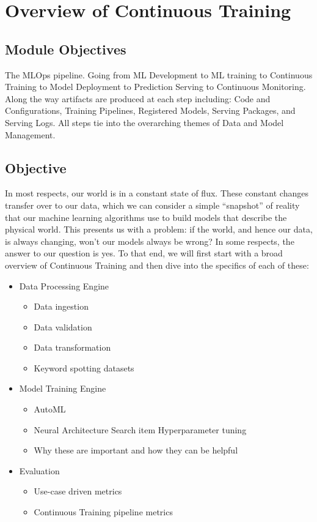 {{{{    
  
\section{Overview of Continuous Training}
\subsection{Module Objectives}

  
  The MLOps pipeline. Going from ML Development to ML training to Continuous Training to Model Deployment to Prediction Serving to Continuous Monitoring. Along the way artifacts are produced at each step including: Code and Configurations, Training Pipelines, Registered Models, Serving Packages, and Serving Logs. All steps tie into the overarching themes of Data and Model Management.
  
\subsection{Objective}

  In most respects, our world is in a constant state of flux. These constant changes transfer over to our data, which we can consider a simple “snapshot” of reality that our machine learning algorithms use to build models that describe the physical world. This presents us with a problem: if the world, and hence our data, is always changing, won’t our models always be wrong? In some respects, the answer to our question is yes. To that end, we will first start with a broad overview of Continuous Training and then dive into the specifics of each of these:
  
  \begin{itemize}
    \item  Data Processing Engine
      \begin{itemize}
        \item Data ingestion
        \item Data validation
        \item Data transformation
        \item Keyword spotting datasets
      \end{itemize}
  \item   Model Training Engine
    \begin{itemize}
      \item AutoML
      \item Neural Architecture Search
      item Hyperparameter tuning
      \item Why these are important and how they can be helpful
    \end{itemize}
  \item Evaluation
    \begin{itemize}
      \item Use-case driven metrics
      \item Continuous Training pipeline metrics
    \end{itemize}
  \end{itemize}
  
}}}}
